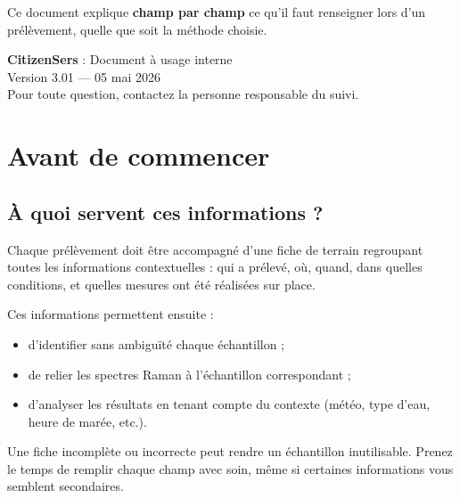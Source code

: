 \documentclass[12pt, a4paper]{article}
\begin{document}
\begin{titlepage}
  \begin{tcolorbox}[
    enhanced, colback=mainblue!5!white, colframe=mainblue!50!black,
    width=0.82\linewidth, arc=5pt, boxrule=0.8pt,
    left=10pt, right=10pt, top=8pt, bottom=8pt
  ]
    \centering
    Ce document explique \textbf{champ par champ} ce qu'il faut
    renseigner lors d'un prélèvement, quelle que soit la méthode choisie.
  \end{tcolorbox}

  \vfill

  {\color{darkgray}\small
    \textbf{CitizenSers} : Document à usage interne\\[4pt]
    Version 3.01 — 05 mai 2026\\[6pt]
    Pour toute question, contactez la personne responsable du suivi.
  }
\end{titlepage}

\newpage
\tableofcontents
\newpage

\section{Avant de commencer}

\subsection{À quoi servent ces informations ?}

Chaque prélèvement doit être accompagné d'une fiche de terrain
regroupant toutes les informations contextuelles : qui a prélevé,
où, quand, dans quelles conditions, et quelles mesures ont été
réalisées sur place.

Ces informations permettent ensuite :
\begin{itemize}
  \item d'identifier sans ambiguïté chaque échantillon ;
  \item de relier les spectres Raman à l'échantillon correspondant ;
  \item d'analyser les résultats en tenant compte du contexte
        (météo, type d'eau, heure de marée, etc.).
\end{itemize}

\begin{attention}
  Une fiche incomplète ou incorrecte peut rendre un échantillon
  inutilisable. Prenez le temps de remplir chaque champ avec soin,
  même si certaines informations vous semblent secondaires.
\end{attention}
\end{document}
